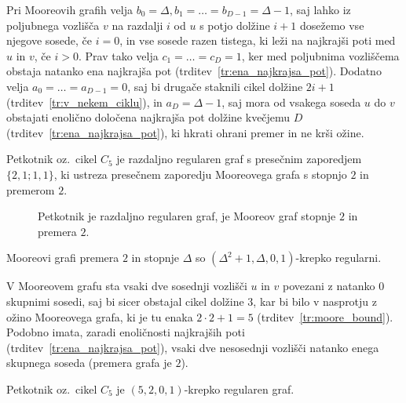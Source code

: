\documentclass[fin1, tisk]{fmfdelo}
\begin{document}
\begin{dokaz}
    Pri Mooreovih grafih velja $b_0 = \Delta, b_1 = \ldots = b_{D-1} = \Delta - 1$, saj lahko iz poljubnega vozlišča $v$ na razdalji $i$
    od $u$ s potjo dolžine $i+1$ dosežemo vse njegove sosede, če $i=0$, in vse sosede razen tistega, ki leži na
    najkrajši poti med $u$ in $v$, če $i>0$. Prav tako velja $c_1 = \ldots = c_D = 1$, ker med poljubnima vozliščema obstaja natanko ena najkrajša pot 
    (trditev~\ref{tr:ena_najkrajsa_pot}). Dodatno velja $a_0 = \ldots = a_{D-1} = 0$, saj bi drugače staknili cikel dolžine $2i+1$
    (trditev~\ref{tr:v_nekem_ciklu}), in $a_D = \Delta - 1$, saj mora od vsakega soseda $u$ do $v$ obstajati enolično določena
    najkrajša pot dolžine kvečjemu $D$ (trditev~\ref{tr:ena_najkrajsa_pot}), ki hkrati ohrani premer in ne krši ožine.
\end{dokaz}

\begin{zgled}
    Petkotnik oz.~cikel $C_5$ je razdaljno regularen graf s presečnim zaporedjem $\{2, 1; 1, 1\}$, ki ustreza presečnem zaporedju
    Mooreovega grafa s stopnjo $2$ in premerom $2$.
\end{zgled}

\begin{figure}[ht]
    \centering
    \def\svgwidth{\columnwidth}
    \caption{Petkotnik je razdaljno regularen graf, je Mooreov graf stopnje $2$ in premera $2$.}
    \label{fig:petkotnik}
\end{figure}


\begin{trditev}\label{tr:moore_krepko_regularen}
    Mooreovi grafi premera $2$ in stopnje $\Delta$ so $(\Delta^2 + 1, \Delta, 0, 1)$-krepko regularni.
\end{trditev}

\begin{dokaz}
    V Mooreovem grafu sta vsaki dve sosednji vozlišči $u$ in $v$ povezani z natanko $0$ skupnimi sosedi, saj bi sicer obstajal 
    cikel dolžine $3$, kar bi bilo v nasprotju z ožino Mooreovega grafa, ki je tu enaka $2\cdot 2 + 1 = 5$ (trditev~\ref{tr:moore_bound}).
    Podobno imata, zaradi enoličnosti najkrajših poti (trditev~\ref{tr:ena_najkrajsa_pot}), vsaki dve nesosednji vozlišči natanko 
    enega skupnega soseda (premera grafa je $2$).
\end{dokaz}

\begin{zgled}
    Petkotnik oz.~cikel $C_5$ je $(5, 2, 0, 1)$-krepko regularen graf.
\end{zgled}
\end{document}
